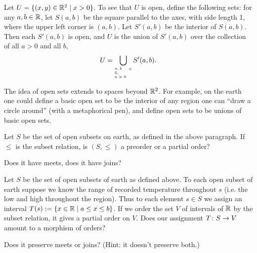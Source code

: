 \begin{blockRUS}
\end{blockRUS}

\begin{exampleENG}
Let $U=\{(x,y)\in{\mathbb R}^2{\;|\;}x>0\}$. To see that $U$ is open, define the following sets: for any $a,b\in{\mathbb R}$, let $S(a,b)$ be the square parallel to the axes, with side length 1, where the upper left corner is $(a,b)$. Let $S'(a,b)$ be the interior of $S(a,b)$. Then each $S'(a,b)$ is open, and $U$ is the union of $S'(a,b)$ over the collection of all $a>0$ and all $b$,$$U=\bigcup_{\parbox{.35in}{\tiny$a,b\in\RR,\\~\;\;a>0$}}S'(a,b).$$ 
\end{exampleENG}

\begin{exampleRUS}
\end{exampleRUS}

\begin{blockENG}
The idea of open sets extends to spaces beyond ${\mathbb R}^2$. For example, on the earth one could define a basic open set to be the interior of any region one can “draw a circle around” (with a metaphorical pen), and define open sets to be unions of basic open sets. 
\end{blockENG}

\begin{blockRUS}
\end{blockRUS}

\begin{exerciseENG}
Let $S$ be the set of open subsets on earth, as defined in the above paragraph. 
\sexc If $\leq$ is the subset relation, is $(S,\leq)$ a preorder or a partial order? 
\item Does it have meets, does it have joins?
\endsexc
\end{exerciseENG}

\begin{exerciseRUS}
\end{exerciseRUS}

\begin{exerciseENG}\label{exc:cosheaf of temps}
Let $S$ be the set of open subsets of earth as defined above. To each open subset of earth suppose we know the range of recorded temperature throughout $s$ (i.e. the low and high throughout the region). Thus to each element $s\in S$ we assign an interval $T(s):=\{x\in{\mathbb R}{\;|\;}a\leq x\leq b\}$. If we order the set $V$ of intervals of ${\mathbb R}$ by the subset relation, it gives a partial order on $V$. 
\sexc Does our assignment $T\colon S\rightarrow V$ amount to a morphism of orders? 
\item Does it preserve meets or joins? (Hint: it doesn't preserve both.)
\endsexc
\end{exerciseENG}

